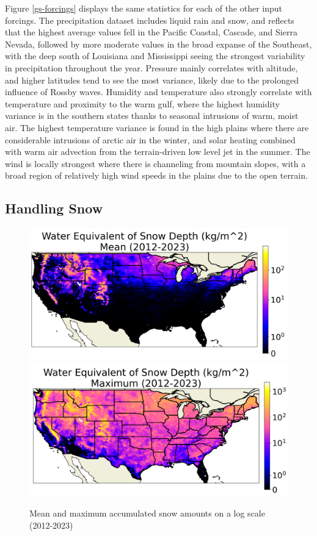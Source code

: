 Figure \ref{gs-forcings} displays the same statistics for each of the other input forcings. The precipitation dataset includes liquid rain and snow, and reflects that the highest average values fell in the Pacific Coastal, Cascade, and Sierra Nevada, followed by more moderate values in the broad expanse of the Southeast, with the deep south of Louisiana and Mississippi seeing the strongest variability in precipitation throughout the year. Pressure mainly correlates with altitude, and higher latitudes tend to see the most variance, likely due to the prolonged influence of Rossby waves. Humidity and temperature also strongly correlate with temperature and proximity to the warm gulf, where the highest humidity variance is in the southern states thanks to seasonal intrusions of warm, moist air. The highest temperature variance is found in the high plains where there are considerable intrusions of arctic air in the winter, and solar heating combined with warm air advection from the terrain-driven low level jet in the summer. The wind is locally strongest where there is channeling from mountain slopes, with a broad region of relatively high wind speeds in the plains due to the open terrain.

\subsection{Handling Snow}

\begin{figure}[hb!]
    \centering
    \includegraphics[width=.48\linewidth]{figures/thesis-gridstats/gridstat-bulk_weasd-log_2012-1_2023-12_y000-195_x000-462_mean.png}
    \includegraphics[width=.48\linewidth]{figures/thesis-gridstats/gridstat-bulk_weasd-log_2012-1_2023-12_y000-195_x000-462_max.png}
    \caption{Mean and maximum accumulated snow amounts on a log scale (2012-2023)}
    \label{gs-snow}
\end{figure}

